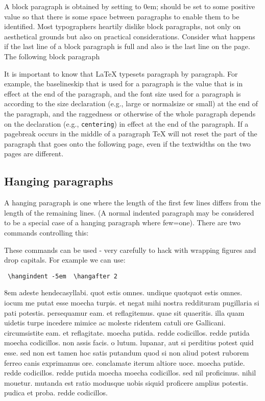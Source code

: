 A block paragraph is obtained by setting  to 0em;  should be set to
some positive value so that there is some space between paragraphs to enable them to be
identified. Most typographers heartily dislike block paragraphs, not only on aesthetical
grounds but also on practical considerations. Consider what happens if the last line of a
block paragraph is full and also is the last line on the page. The following block paragraph

It is important to know that LaTeX typesets paragraph by paragraph. For example, the
baselineskip that is used for a paragraph is the value that is in effect at the end of the
paragraph, and the font size used for a paragraph is according to the size declaration (e.g.,
large or normalsize or small) at the end of the paragraph, and the raggedness or
otherwise of the whole paragraph depends on the declaration (e.g., \texttt{centering}) in effect
at the end of the paragraph. If a pagebreak occurs in the middle of a paragraph TeX will
not reset the part of the paragraph that goes onto the following page, even if the textwidths
on the two pages are different.


\subsection{Hanging paragraphs}
                                                                                                  \begin{macro}{\hangafter}
\begin{macro}{\hangindent}
A hanging paragraph is one where the length of the first few lines differs from the length
of the remaining lines. (A normal indented paragraph may be considered to be a special case of a hanging paragraph where few=one). There are two commands controlling this:
\end{macro}
\end{macro}


These commands can be used - very carefully to hack with wrapping figures
and drop capitals. For example we can use:

\verb+ \hangindent -5em  \hangafter 2+ 

\begin{texexample}{}{}
\noindent\hangindent 8em    \footnotesize
adeste hendecasyllabi. quot estis 
omnes. undique quotquot estis omnes. 
iocum me putat esse moecha turpis. 
et negat mihi nostra reddituram 
pugillaria si pati potestis. 
persequamur eam. et reflagitemus. 
quae sit quaeritis. illa quam uidetis 
turpe incedere mimice ac moleste 
ridentem catuli ore Gallicani. 
circumsistite eam. et reflagitate. 
moecha putida. redde codicillos. 
redde putida moecha codicillos. 
non assis facis. o lutum. lupanar, 
aut si perditius potest quid esse. 
sed non est tamen hoc satis putandum 
quod si non aliud potest ruborem 
ferreo canis exprimamus ore. 
conclamate iterum altiore uoce. 
moecha putide. redde codicillos. 
redde putida moecha moecha codicillos. 
sed nil proficimus. nihil mouetur. 
mutanda est ratio modusque uobis 
siquid proficere amplius potestis. 
pudica et proba. redde codicillos.

\end{texexample}


